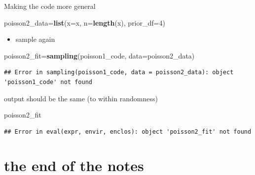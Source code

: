\documentclass[ignorenonframetext,]{beamer}
\newenvironment{Shaded}{\begin{snugshade}}{\end{snugshade}}
\newcommand{\DataTypeTok}[1]{\textcolor[rgb]{0.13,0.29,0.53}{#1}}
\newcommand{\DecValTok}[1]{\textcolor[rgb]{0.00,0.00,0.81}{#1}}
\newcommand{\KeywordTok}[1]{\textcolor[rgb]{0.13,0.29,0.53}{\textbf{#1}}}
\newcommand{\NormalTok}[1]{#1}
\providecommand{\tightlist}{%
  \setlength{\itemsep}{0pt}\setlength{\parskip}{0pt}}
\begin{document}
\begin{frame}[fragile]{Making the code more general}
\begin{Shaded}
\begin{Highlighting}[]
\NormalTok{poisson2_data=}\KeywordTok{list}\NormalTok{(}\DataTypeTok{x=}\NormalTok{x, }\DataTypeTok{n=}\KeywordTok{length}\NormalTok{(x), }\DataTypeTok{prior_df=}\DecValTok{4}\NormalTok{)}
\end{Highlighting}
\end{Shaded}

\begin{itemize}
\tightlist
\item
  sample again
\end{itemize}

\begin{Shaded}
\begin{Highlighting}[]
\NormalTok{poisson2_fit=}\KeywordTok{sampling}\NormalTok{(poisson1_code, }\DataTypeTok{data=}\NormalTok{poisson2_data)}
\end{Highlighting}
\end{Shaded}

\begin{verbatim}
## Error in sampling(poisson1_code, data = poisson2_data): object 'poisson1_code' not found
\end{verbatim}

\end{frame}

\begin{frame}[fragile]{output should be the same (to within randomness)}
\protect\hypertarget{output-should-be-the-same-to-within-randomness}{}

\begin{Shaded}
\begin{Highlighting}[]
\NormalTok{poisson2_fit}
\end{Highlighting}
\end{Shaded}

\begin{verbatim}
## Error in eval(expr, envir, enclos): object 'poisson2_fit' not found
\end{verbatim}

\end{frame}

\hypertarget{the-end-of-the-notes}{%
\section{the end of the notes}\label{the-end-of-the-notes}}
\end{document}
